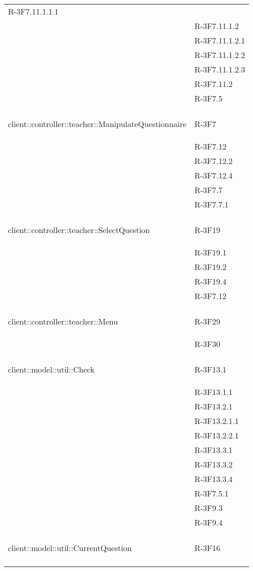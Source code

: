 \begin{longtable}{l p{3cm}}
R-3F7.11.1.1.1 \tabularnewline &

R-3F7.11.1.2 \tabularnewline &

R-3F7.11.1.2.1 \tabularnewline &

R-3F7.11.1.2.2 \tabularnewline &

R-3F7.11.1.2.3 \tabularnewline &

R-3F7.11.2 \tabularnewline &

R-3F7.5 \tabularnewline &\tabularnewline
\midrule
\hypertarget{client::controller::teacher::ManipulateQuestionnaire}{client::controller::teacher::ManipulateQuestionnaire} & R-3F7 \tabularnewline &

R-3F7.12 \tabularnewline &

R-3F7.12.2 \tabularnewline &

R-3F7.12.4 \tabularnewline &

R-3F7.7 \tabularnewline &

R-3F7.7.1 \tabularnewline &\tabularnewline
\midrule
\hypertarget{client::controller::teacher::SelectQuestion}{client::controller::teacher::SelectQuestion} & R-3F19 \tabularnewline &

R-3F19.1 \tabularnewline &

R-3F19.2 \tabularnewline &

R-3F19.4 \tabularnewline &

R-3F7.12 \tabularnewline &\tabularnewline
\midrule
\hypertarget{client::controller::teacher::Menu}{client::controller::teacher::Menu} & R-3F29 \tabularnewline &

R-3F30 \tabularnewline &\tabularnewline
\midrule
\hypertarget{client::model::util::Check}{client::model::util::Check} & R-3F13.1 \tabularnewline &

R-3F13.1.1 \tabularnewline &

R-3F13.2.1 \tabularnewline &

R-3F13.2.1.1 \tabularnewline &

R-3F13.2.2.1 \tabularnewline &

R-3F13.3.1 \tabularnewline &

R-3F13.3.2 \tabularnewline &

R-3F13.3.4 \tabularnewline &

R-3F7.5.1 \tabularnewline &

R-3F9.3 \tabularnewline &

R-3F9.4 \tabularnewline &\tabularnewline
\midrule
\hypertarget{client::model::util::CurrentQuestion}{client::model::util::CurrentQuestion} & R-3F16 \tabularnewline &


\end{longtable}
